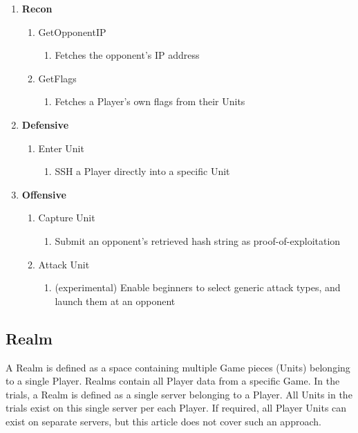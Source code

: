 \documentclass[10pt, titlepage, twocolumn]{article}
\newcommand{\ii}{\indent\indent}
\begin{document}
\begin{enumerate}
	\item \textbf{Recon}
	\begin{enumerate}
		\item GetOpponentIP
			\begin{enumerate}
				\item Fetches the opponent's IP address 
			\end{enumerate}
		\item GetFlags
			\begin{enumerate}
				\item Fetches a Player's own flags from their Units
			\end{enumerate}
	\end{enumerate}
	\item \textbf{Defensive}
	\begin{enumerate}
		\item Enter Unit
			\begin{enumerate}
				\item SSH a Player directly into a specific Unit
			\end{enumerate}
	\end{enumerate}
	\item \textbf{Offensive}
	\begin{enumerate}
		\item Capture Unit
			\begin{enumerate}
				\item Submit an opponent's retrieved hash string as proof-of-exploitation
			\end{enumerate}
		\item Attack Unit
			\begin{enumerate}
				\item (experimental) Enable beginners to select generic attack types, and launch them at an opponent
			\end{enumerate}
	\end{enumerate}
\end{enumerate}

\subsection{Realm}
\ii
A Realm is defined as a space containing multiple Game pieces (Units) belonging to a single Player.  Realms contain all Player data from a specific Game. In the trials, a Realm is defined as a single server belonging to a Player. All Units in the trials exist on this single server per each Player. If required, all Player Units can exist on separate servers, but this article does not cover such an approach.
\end{document}
